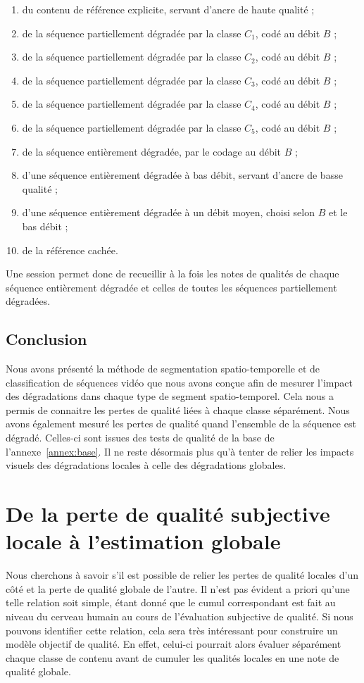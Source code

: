 \begin{enumerate}
\item du contenu de référence explicite, servant d'ancre de haute qualité ;
\item de la séquence partiellement dégradée par la classe $C_1$, codé au débit $B$ ;
\item de la séquence partiellement dégradée par la classe $C_2$, codé au débit $B$ ;
\item de la séquence partiellement dégradée par la classe $C_3$, codé au débit $B$ ;
\item de la séquence partiellement dégradée par la classe $C_4$, codé au débit $B$ ;
\item de la séquence partiellement dégradée par la classe $C_5$, codé au débit $B$ ;
\item de la séquence entièrement dégradée, par le codage au débit $B$ ;
\item d'une séquence entièrement dégradée à bas débit, servant d'ancre de basse qualité ;
\item d'une séquence entièrement dégradée à un débit moyen, choisi selon $B$ et le bas débit ;
\item de la référence cachée.
\end{enumerate}

Une session permet donc de recueillir à la fois les notes de qualités de chaque séquence entièrement dégradée et celles de toutes les séquences partiellement dégradées.


\subsection{Conclusion}
Nous avons présenté la méthode de segmentation spatio-temporelle et de classification de séquences vidéo que nous avons conçue afin de mesurer l'impact des dégradations dans chaque type de segment spatio-temporel. Cela nous a permis de connaitre les pertes de qualité liées à chaque classe séparément. Nous avons également mesuré les pertes de qualité quand l'ensemble de la séquence est dégradé. Celles-ci sont issues des tests de qualité de la base de l'annexe~\ref{annex:base}. Il ne reste désormais plus qu'à tenter de relier les impacts visuels des dégradations locales à celle des dégradations globales.


\section{De la perte de qualité subjective locale à l'estimation globale} \label{sec:deLocalAGlobal}
Nous cherchons à savoir s'il est possible de relier les pertes de qualité locales d'un côté et la perte de qualité globale de l'autre. Il n'est pas évident a priori qu'une telle relation soit simple, étant donné que le cumul correspondant est fait au niveau du cerveau humain au cours de l'évaluation subjective de qualité. Si nous pouvons identifier cette relation, cela sera très intéressant pour construire un modèle objectif de qualité. En effet, celui-ci pourrait alors évaluer séparément chaque classe de contenu avant de cumuler les qualités locales en une note de qualité globale.

